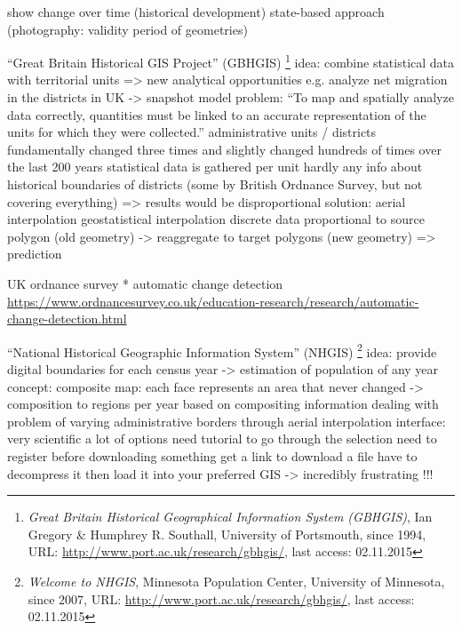  show change over time (historical development)
  state-based approach (photography: validity period of geometries)

  ``Great Britain Historical GIS Project'' (GBHGIS)
    \footnote{
      \textit{Great Britain Historical Geographical Information System (GBHGIS)},
      Ian Gregory \& Humphrey R. Southall, University of Portsmouth, since 1994,
      URL: \url{http://www.port.ac.uk/research/gbhgis/},
      last access: 02.11.2015
    }
    idea:
      combine statistical data with territorial units
      => new analytical opportunities
      e.g. analyze net migration in the districts in UK
      -> snapshot model
    problem:
      ``To map and spatially analyze data correctly, quantities must be linked to an accurate representation of the units for which they were collected.''
      administrative units / districts fundamentally changed three times and slightly changed hundreds of times over the last 200 years
      statistical data is gathered per unit
      hardly any info about historical boundaries of districts
      (some by British Ordnance Survey, but not covering everything)
      => results would be disproportional
    \cite[pp. 117-129]{knowles2002past}
    solution: aerial interpolation
      geostatistical interpolation
      discrete data proportional to source polygon (old geometry) -> reaggregate to target polygons (new geometry)
      => prediction
      \cite{aerialInterpolation}

    UK ordnance survey
      * automatic change detection
      \url{https://www.ordnancesurvey.co.uk/education-research/research/automatic-change-detection.html}

  ``National Historical Geographic Information System'' (NHGIS)
    \footnote{
      \textit{Welcome to NHGIS},
      Minnesota Population Center, University of Minnesota,
      since 2007,
      URL: \url{http://www.port.ac.uk/research/gbhgis/},
      last access: 02.11.2015
    }
    idea:
      provide digital boundaries for each census year
      -> estimation of population of any year
    concept:
      composite map: each face represents an area that never changed
      -> composition to regions per year based on compositing information
      dealing with problem of varying administrative borders through aerial interpolation
    interface:
      very scientific a lot of options
      need tutorial to go through the selection
      need to register before downloading something
      get a link to download a file
      have to decompress it
      then load it into your preferred GIS
      -> incredibly frustrating !!!


